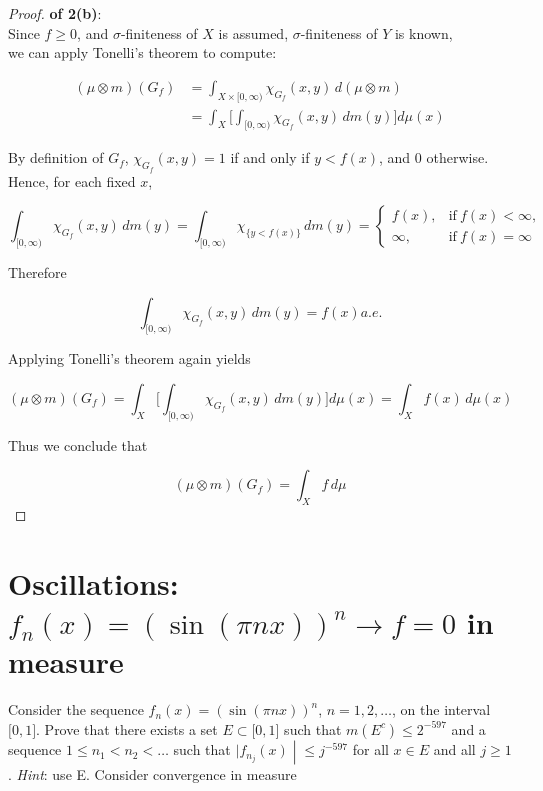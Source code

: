 \documentclass{qlnotes-export}
\begin{document}
\begin{proof}

\textbf{of 2(b)}:\\
Since \(f \geq 0\), and \(\sigma\)-finiteness of \(X\) is assumed, \(\sigma\)-finiteness of \(Y\) is known,\\
we can apply Tonelli's theorem to compute:

\[\begin{matrix}
{(\mu \otimes m)(G_{f})} & {= \int_{X \times \lbrack 0,\infty)}\chi_{G_{f}}(x,y)\, d(\mu \otimes m)} \\
 & {= \int_{X}\lbrack\int_{\lbrack 0,\infty)}\chi_{G_{f}}(x,y)\, dm(y)\rbrack d\mu(x)}
\end{matrix}\]

By definition of \(G_{f}\), \(\chi_{G_{f}}(x,y) = 1\) if and only if \(y < f(x)\), and \(0\) otherwise. Hence, for each fixed \(x\),

\[\int_{\lbrack 0,\infty)}\chi_{G_{f}}(x,y)\, dm(y) = \int_{\lbrack 0,\infty)}\chi_{\{{y < f(x)}\}}\, dm(y) = \left\{ \begin{matrix}
{f(x),} & {\text{if}\ f(x) < \infty,} \\
{\infty,} & {\text{if}\ f(x) = \infty}
\end{matrix} \right.\]

Therefore

\[\int_{\lbrack 0,\infty)}\chi_{G_{f}}(x,y)\, dm(y) = f(x) a.e.\]

Applying Tonelli's theorem again yields

\[(\mu \otimes m)(G_{f}) = \int_{X}\lbrack\int_{\lbrack 0,\infty)}\chi_{G_{f}}(x,y)\, dm(y)\rbrack d\mu(x) = \int_{X}f(x)\, d\mu(x)\]

Thus we conclude that

\[(\mu \otimes m)(G_{f}) = \int_{X}f\, d\mu\]

\end{proof}

\section{\texorpdfstring{Oscillations: \(f_{n}(x) = (\sin(\pi nx))^{n}\rightarrow f = 0\) in measure}{Oscillations: f\_\{n\}(x) = (\textbackslash sin(\textbackslash pi nx))\^{}\{n\}\textbackslash rightarrow f = 0 in measure}}\label{oscillations-f_nxsinpi-n-xn-to-f-0-in-measure}

Consider the sequence \(f_{n}(x) = (\sin(\pi nx))^{n}\), \(n = 1,2,\ldots\), on the interval \(\lbrack 0,1\rbrack\). Prove that there exists a set \(E \subset \lbrack 0,1\rbrack\) such that \(m(E^{c}) \leq 2^{- 597}\) and a sequence \(1 \leq n_{1} < n_{2} < \ldots\) such that \(\left. |f_{n_{j}}(x) \middle| \leq j^{- 597} \right.\) for all \(x \in E\) and all \(j \geq 1\). \emph{Hint}: use E. Consider convergence in measure
\end{document}
